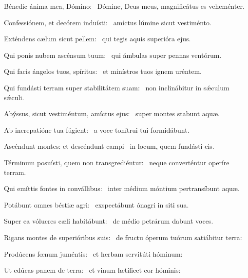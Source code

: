 \item Bénedic ánima mea, Dómino:~\psstar{} Dómine, Deus meus, magnificátus es veheménter.

\item Confessiónem, et decórem induísti:~\psstar{} amíctus lúmine sicut vestiménto.

\item Exténdens cælum sicut pellem:~\psstar{} qui tegis aquis superióra ejus.

\item Qui ponis nubem ascénsum tuum:~\psstar{} qui ámbulas super pennas ventórum.

\item Qui facis ángelos tuos, spíritus:~\psstar{} et minístros tuos ignem uréntem.

\item Qui fundásti terram super stabilitátem suam:~\psstar{} non inclinábitur in sǽculum sǽculi.

\item Abýssus, sicut vestiméntum, amíctus ejus:~\psstar{} super montes stabunt aquæ.

\item Ab increpatióne tua fúgient:~\psstar{} a voce tonítrui tui formidábunt.

\item Ascéndunt montes: et descéndunt campi~\psstar{} in locum, quem fundásti eis.

\item Términum posuísti, quem non transgrediéntur:~\psstar{} neque converténtur operíre terram.

\item Qui emíttis fontes in convállibus:~\psstar{} inter médium móntium pertransíbunt aquæ.

\item Potábunt omnes béstiæ agri:~\psstar{} exspectábunt ónagri in siti sua.

\item Super ea vólucres cæli habitábunt:~\psstar{} de médio petrárum dabunt voces.

\item Rigans montes de superióribus suis:~\psstar{} de fructu óperum tuórum satiábitur terra:

\item Prodúcens fœnum juméntis:~\psstar{} et herbam servitúti hóminum:

\item Ut edúcas panem de terra:~\psstar{} et vinum lætíficet cor hóminis:

